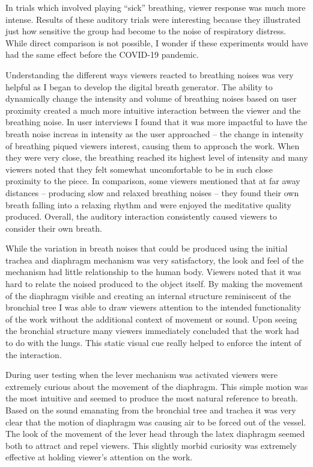 \documentclass[letterpaper]{article}
\begin{document}
In trials which involved playing ``sick'' breathing, viewer response was much more intense. Results of these auditory trials were interesting because they illustrated just how sensitive the group had become to the noise of respiratory distress. While direct comparison is not possible, I wonder if these experiments would have had the same effect before the COVID-19 pandemic.  

Understanding the different ways viewers reacted to breathing noises was very helpful as I began to develop the digital breath generator. The ability to dynamically change the intensity and volume of breathing noises based on user proximity created a much more intuitive interaction between the viewer and the breathing noise. In user interviews I found that it was more impactful to have the breath noise increas in intensity as the user approached -- the change in intensity of breathing piqued viewers interest, causing them to approach the work. When they were very close, the breathing reached its highest level of intensity and many viewers noted that they felt somewhat uncomfortable to be in such close proximity to the piece. In comparison, some viewers mentioned that at far away distances -- producing slow and relaxed breathing noises -- they found their own breath falling into a relaxing rhythm and were enjoyed the meditative quality produced. Overall, the auditory interaction consistently caused viewers to consider their own breath. 

While the variation in breath noises that could be produced using the initial trachea and diaphragm mechanism was very satisfactory, the look and feel of the mechanism had little relationship to the human body. Viewers noted that it was hard to relate the noised produced to the object itself. By making the movement of the diaphragm visible and creating an internal structure reminiscent of the bronchial tree I was able to draw viewers attention to the intended functionality of the work without the additional context of movement or sound. Upon seeing the bronchial structure many viewers immediately concluded that the work had to do with the lungs. This static visual cue really helped to enforce the intent of the interaction.

During user testing when the lever mechanism was activated viewers were extremely curious about the movement of the diaphragm. This simple motion was the most intuitive and seemed to produce the most natural reference to breath. Based on the sound emanating from the bronchial tree and trachea it was very clear that the motion of diaphragm was causing air to be forced out of the vessel. The look of the movement of the lever head through the latex diaphragm seemed both to attract and repel viewers. This slightly morbid curiosity was extremely effective at holding viewer's attention on the work.  
\end{document}
